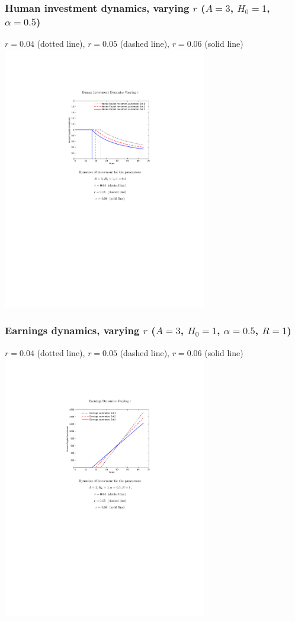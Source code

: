 \documentclass[12pt,compress,handout]{beamer}  %
\begin{document}
\begin{frame}
\frametitle{Human investment dynamics, varying $r$ ($A=3$,
$H_{0}=1$, $\alpha=0.5$)}
\begin{center}
{\footnotesize $r =0.04$ (dotted line), $r =0.05$ (dashed line), $r
=0.06$ (solid line)}
\includegraphics[width=3.5in]{include/fig-hc-earn-series-05.pdf}
\end{center}
\end{frame}


\begin{frame}
\frametitle{Earnings dynamics, varying $r$ ($A=3$, $H_{0}=1$,
$\alpha=0.5$, $R=1$)}
\begin{center}
{\footnotesize $r =0.04$ (dotted line), $r =0.05$ (dashed line), $r
=0.06$ (solid line)}
\includegraphics[width=3.5in]{include/fig-hc-earn-series-06.pdf}
\end{center}
\end{frame}
\end{document}
